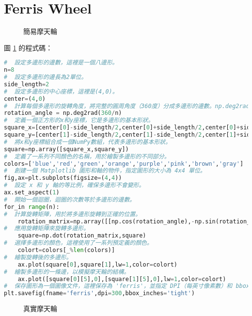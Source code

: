 \documentclass[12pt, a4paper]{article}
\begin{document}
\section{Ferris Wheel}
\begin{figure}[h]
    \caption{簡易摩天輪}
    \label{fig:ferriswheel_1}
\end{figure}
圖 \ref{fig:ferriswheel_1} 的程式碼：
\begin{lstlisting}[language=Python]
#  設定多邊形的邊數，這裡是一個八邊形。
n=8
#  設定多邊形的邊長為2單位。
side_length=2  
#  設定多邊形的中心座標，這裡是(4,0)。
center=(4,0)  
#  計算每個多邊形的旋轉角度，將完整的圓周角度（360度）分成多邊形的邊數。np.deg2rad 函數用於將度數轉換為弧度。
rotation_angle = np.deg2rad(360/n) 
#  定義一個正方形的x和y座標，它是多邊形的基本形狀。
square_x=[center[0]-side_length/2,center[0]+side_length/2,center[0]+side_length/2,center[0]-side_length/2,center[0]-side_length/2,center[0]-side_length/2]
square_y=[center[1]-side_length/2,center[1]-side_length/2,center[1]+side_length/2,center[1]+side_length/2,center[1]-side_length/2,center[1]]
#  將x和y座標組合成一個NumPy數組，代表多邊形的基本形狀。
square=np.array([square_x,square_y])
#  定義了一系列不同顏色的名稱，用於繪製多邊形的不同部分。
colors=['blue','red','green','orange','purple','pink','brown','gray']
#  創建一個 Matplotlib 圖形和軸的物件，指定圖形的大小為 4x4 單位。
fig,ax=plt.subplots(figsize=(4,4))
#  設定 x 和 y 軸的等比例，確保多邊形不會變形。
ax.set_aspect(1)
#  開始一個迴圈，迴圈的次數等於多邊形的邊數。
for_in range(n):
#  計算旋轉矩陣，用於將多邊形旋轉到正確的位置。
    rotation_matrix=np.array([[np.cos(rotation_angle),-np.sin(rotation_angle)],[np.sin(rotation_angle), np.cos(rotation_angle)]])
#  應用旋轉矩陣來旋轉多邊形。
    square=np.dot(rotation_matrix,square)
#  選擇多邊形的顏色，這裡使用了一系列預定義的顏色。
    colort=colors[_%len(colors)]
#  繪製旋轉後的多邊形。
    ax.plot(square[0],square[1],lw=1,color=colort)
#  繪製多邊形的一條邊，以模擬摩天輪的結構。
    ax.plot([square[0][5],0],[square[1][5],0],lw=1,color=colort)
#  保存圖形為一個圖像文件，這裡保存為 'ferris'，並指定 DPI（每英寸像素數）和 bbox（用於確保圖形不被裁切）。
plt.savefig(fname='ferris',dpi=300,bbox_inches='tight')
\end{lstlisting}
\begin{figure}[h]
    \caption{真實摩天輪}
    \label{fig:ferriswheel_2}
\end{figure}
\end{document}
